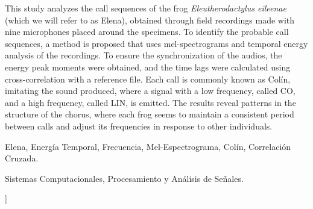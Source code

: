 \documentclass[a4paper,10pt,twocolumn]{article}
\begin{document}
\begin{enabstract}

	This study analyzes the call sequences of the 
	frog \textit{Eleutherodactylus eileenae} 
	(which we will refer to as Elena), 
	obtained through field recordings made with 
	nine microphones placed around the specimens. 
	To identify the probable call sequences, 
	a method is proposed that uses mel-spectrograms 
	and temporal energy analysis of the recordings. 
	To ensure the synchronization of the audios, 
	the energy peak moments were obtained, 
	and the time lags were calculated using 
	cross-correlation with a reference file. 
	Each call is commonly known as Colín, 
	imitating the sound produced, 
	where a signal with a low frequency, called CO, 
	and a high frequency, called LIN, is emitted. 
	The results reveal patterns in the structure of 
	the chorus, where each frog seems to maintain a 
	consistent period between calls and adjust its 
	frequencies in response to other individuals.
\end{enabstract}

\begin{keywords}
	Elena,
	Energía Temporal,
	Frecuencia,
	Mel-Espectrograma,
	Colín,
	Correlación Cruzada.
\end{keywords}

\begin{topics}
	Sistemas Computacionales, Procesamiento y Análisis de Señales.
\end{topics}


\vspace{0.8cm}
]



\end{document}
